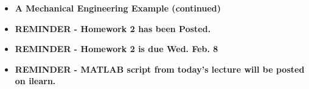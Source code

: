 \documentclass[11pt]{article}
\begin{document}
\begin{itemize}
\item \textbf{\LARGE A Mechanical Engineering Example (continued)}\\			

		

		




\newpage 

	\item \textbf{ \LARGE REMINDER - Homework 2 has been Posted.} \\
	 \item \textbf{ \LARGE REMINDER - Homework 2 is due Wed. Feb. 8} \\
	\item \textbf{ \LARGE REMINDER - MATLAB script from today's lecture will be posted on ilearn. } \\

\end{itemize}


	
\end{document}
